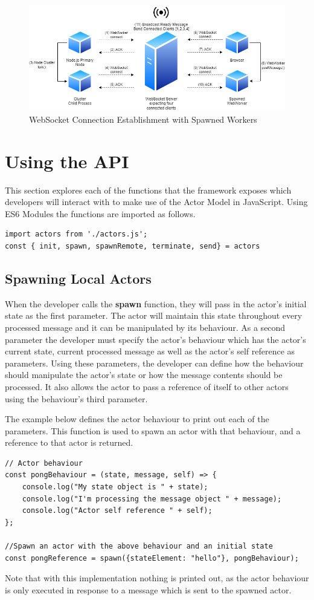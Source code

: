 \documentclass[12pt, a4paper]{report}
\theoremstyle{definition}
\theoremstyle{definition}%
\theoremstyle{definition}%
\theoremstyle{definition}%
\theoremstyle{definition}%
\theoremstyle{definition}%
\begin{document}
\begin{figure}[H]
    \begin{centering}
        \includegraphics[width=\textwidth]{resources/websocketconnectioncomplex.png}
        \caption{WebSocket Connection Establishment with Spawned Workers}
    \end{centering}
\end{figure}
\section{Using the API}
This section explores each of the functions that the framework exposes which developers will interact with to make use of the Actor Model in JavaScript. Using ES6 Modules the functions are imported as follows.
\begin{lstlisting}
import actors from './actors.js';
const { init, spawn, spawnRemote, terminate, send} = actors
\end{lstlisting}
\subsection{Spawning Local Actors}
When the developer calls the \textbf{spawn} function, they will pass in the actor's initial state as the first parameter. The actor will maintain this state throughout every processed message and it can be manipulated by its behaviour. As a second parameter the developer must specify the actor's behaviour which has the actor's current state, current processed message as well as the actor's self reference as parameters. Using these parameters, the developer can define how the behaviour should manipulate the actor's state or how the message contents should be processed. It also allows the actor to pass a reference of itself to other actors using the behaviour's third parameter.

The example below defines the actor behaviour to print out each of the parameters. This function is used to spawn an actor with that behaviour, and a reference to that actor is returned.
\begin{lstlisting}
// Actor behaviour
const pongBehaviour = (state, message, self) => {
    console.log("My state object is " + state);
    console.log("I'm processing the message object " + message);
    console.log("Actor self reference " + self);
};

//Spawn an actor with the above behaviour and an initial state
const pongReference = spawn({stateElement: "hello"}, pongBehaviour);
\end{lstlisting}
Note that with this implementation nothing is printed out, as the actor behaviour is only executed in response to a message which is sent to the spawned actor.
\end{document}
